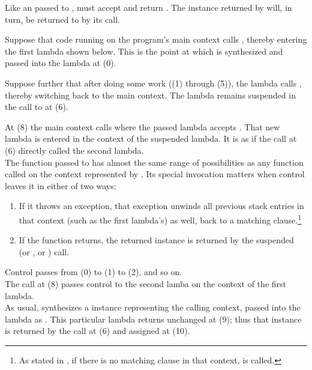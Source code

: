 Like an \entryfn passed to \callcc,  must accept
 and return \cont. The \cont instance returned
by  will, in turn, be returned to  by its \suspend
call.

Suppose that code running on the program's main context
calls , thereby entering the first lambda shown below. This
is the point at which  is synthesized and passed into the lambda at (0).

Suppose further that after doing some work ((1) through (5)), the lambda
calls , thereby switching back to the main context. The
lambda remains suspended in the call to  at (6).

At (8) the main context calls  where the passed
lambda accepts . That new lambda is entered in the
context of the suspended lambda. It is as if the  call at (6)
directly called the second lambda.\\

The function passed to \resumewith has almost the same range of possibilities
as any function called on the context represented by . Its special
invocation matters when control leaves it in either of two ways:

\begin{enumerate}
  \item If it throws an exception, that exception unwinds all previous stack
        entries in that context (such as the first lambda's) as well, back to
        a matching  clause.\footnote{As stated
        in , if there is no matching 
        clause in that context,  is called.}
  \item If the function returns, the returned \cont instance is returned by
        the suspended  (or \callcc, or \resumewith) call.
\end{enumerate}


Control passes from (0) to (1) to (2), and so on.\\

The  call at (8) passes control
to the second lamba on the context of the first lambda.\\

As usual, \resumewith synthesizes a \cont instance representing the calling
context, passed into the lambda as . This particular lambda
returns  unchanged at (9); thus that  instance is returned by
the \resume call at (6) and assigned at (10).\\

